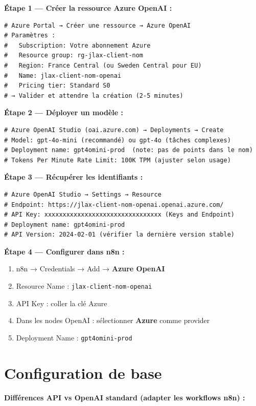 \documentclass[11pt, a4paper]{article}
\begin{document}
\textbf{Étape 1 — Créer la ressource Azure OpenAI :}
\begin{lstlisting}[style=terminal, caption={Azure Portal — Création de la ressource}]
# Azure Portal → Créer une ressource → Azure OpenAI
# Paramètres :
#   Subscription: Votre abonnement Azure
#   Resource group: rg-jlax-client-nom
#   Region: France Central (ou Sweden Central pour EU)
#   Name: jlax-client-nom-openai
#   Pricing tier: Standard S0
# → Valider et attendre la création (2-5 minutes)
\end{lstlisting}

\textbf{Étape 2 — Déployer un modèle :}
\begin{lstlisting}[style=terminal]
# Azure OpenAI Studio (oai.azure.com) → Deployments → Create
# Model: gpt-4o-mini (recommandé) ou gpt-4o (tâches complexes)
# Deployment name: gpt4omini-prod  (note: pas de points dans le nom)
# Tokens Per Minute Rate Limit: 100K TPM (ajuster selon usage)
\end{lstlisting}

\textbf{Étape 3 — Récupérer les identifiants :}
\begin{lstlisting}[style=terminal]
# Azure OpenAI Studio → Settings → Resource
# Endpoint: https://jlax-client-nom-openai.openai.azure.com/
# API Key: xxxxxxxxxxxxxxxxxxxxxxxxxxxxxxxx (Keys and Endpoint)
# Deployment name: gpt4omini-prod
# API Version: 2024-02-01 (vérifier la dernière version stable)
\end{lstlisting}

\textbf{Étape 4 — Configurer dans n8n :}
\begin{enumerate}
  \item n8n → Credentials → Add → \textbf{Azure OpenAI}
  \item Resource Name : \texttt{jlax-client-nom-openai}
  \item API Key : coller la clé Azure
  \item Dans les nodes OpenAI : sélectionner \textbf{Azure} comme provider
  \item Deployment Name : \texttt{gpt4omini-prod}
\end{enumerate}

\section{Configuration de base}

\textbf{Différences API vs OpenAI standard (adapter les workflows n8n) :}
\end{document}
